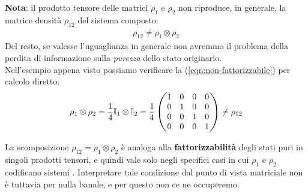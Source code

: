 \documentclass[../../InformazioneQuantistica.tex]{subfiles}
\begin{document}
\textbf{Nota}: il prodotto tensore delle matrici $\rho_1$ e $\rho_2$ non riproduce, in generale, la matrice densità $\rho_{12}$ del sistema composto:
\begin{align}
\rho_{12} \neq \rho_1 \otimes \rho_2
\label{eqn:non-fattorizzabile}
\end{align}
Del resto, se valesse l'uguaglianza in generale non avremmo il problema della perdita di informazione sulla \textit{purezza} dello stato originario.\\

Nell'esempio appena visto possiamo verificare la (\ref{eqn:non-fattorizzabile}) per calcolo diretto:
\begin{align*}
\rho_1 \otimes \rho_2 = \frac{1}{4}\mathbb{I}_1 \otimes \mathbb{I}_2 =\frac{1}{4} \begin{pmatrix}
1 & 0 & 0 & 0\\
0 & 1 & 0 & 0\\
0 & 0 & 1 & 0\\
0 & 0 & 0 & 1
\end{pmatrix} \neq \rho_{12}
\end{align*}

La scomposizione $\rho_{12}=\rho_1 \otimes \rho_2$ è analoga alla \textbf{fattorizzabilità} degli stati puri in singoli prodotti tensori, e quindi vale solo negli specifici casi in cui $\rho_1$ e $\rho_2$ codificano sistemi . Interpretare tale condizione dal punto di vista matriciale non è tuttavia per nulla banale, e per questo non ce ne occuperemo.
\end{document}
